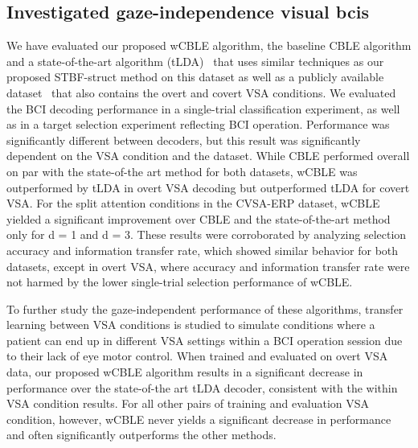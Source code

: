 


\subsection{Investigated gaze-independence visual \acp{bci}}

We have evaluated our proposed wCBLE algorithm, the baseline CBLE algorithm and
a state-of-the-art algorithm (tLDA)~\cite{Sosulski2022} that uses similar techniques as our
proposed STBF-struct method on this dataset as well as a publicly available
dataset~\cite{Aloise2012} that also contains the overt and covert VSA conditions.
We evaluated the BCI decoding performance in a single-trial classification experiment,
as well as in a target selection experiment reflecting BCI operation.
Performance was significantly different between decoders, but this
result was significantly dependent on the VSA condition and the dataset.
While CBLE performed overall on par with the state-of-the art method for both datasets, wCBLE was
outperformed by tLDA in overt VSA decoding but outperformed
tLDA for covert VSA.
For the split attention conditions in the CVSA-ERP
dataset, wCBLE yielded a significant improvement over CBLE and the
state-of-the-art method only for d = 1 and d = 3.
These results were corroborated by analyzing selection accuracy and information
transfer rate, which showed similar behavior for both datasets, except in overt
VSA, where accuracy and information transfer rate were not harmed by the lower
single-trial selection performance of wCBLE.

To further study the gaze-independent performance of these algorithms, transfer
learning between VSA conditions is studied to simulate conditions where a patient
can end up in different VSA settings within a BCI operation session due to their
lack of eye motor control.
When trained and evaluated on overt VSA data, our proposed wCBLE algorithm results in a significant decrease in performance
over the state-of-the art tLDA decoder, consistent with the within VSA
condition results.
For all other pairs of training and evaluation VSA condition, however, wCBLE
never yields a significant decrease in performance and often significantly
outperforms the other methods.





